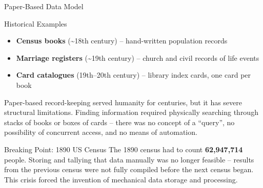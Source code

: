 \begin{frame}{Paper-Based Data Model}
  \begin{block}{Historical Examples}
    \begin{itemize}
      \item \textbf{Census books} (\textasciitilde{}18th century) -- hand-written population records
      \item \textbf{Marriage registers} (\textasciitilde{}19th century) -- church and civil records of life events
      \item \textbf{Card catalogues} (19th--20th century) -- library index cards, one card per book
    \end{itemize}
  \end{block}

  Paper-based record-keeping served humanity for centuries, but it has severe
  structural limitations.  Finding information required physically searching
  through stacks of books or boxes of cards -- there was no concept of a
  ``query'', no possibility of concurrent access, and no means of automation.

  \begin{alertblock}{Breaking Point: 1890 US Census}
    The 1890 census had to count \textbf{62,947,714} people.  Storing and
    tallying that data manually was no longer feasible -- results from the
    previous census were not fully compiled before the next census began.
    This crisis forced the invention of mechanical data storage and processing.
  \end{alertblock}
\end{frame}

